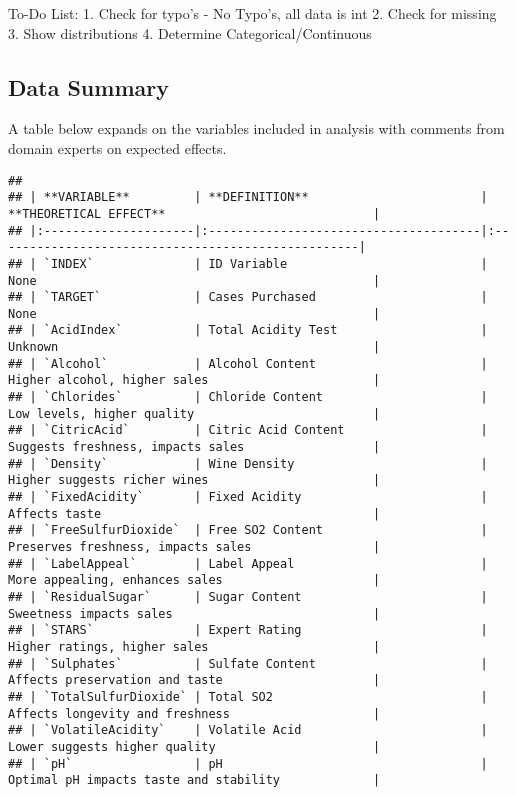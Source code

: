 \documentclass[
]{article}
\begin{document}
To-Do List: 1. Check for typo's - No Typo's, all data is int 2. Check
for missing 3. Show distributions 4. Determine Categorical/Continuous

\subsection{Data Summary}\label{data-summary}

A table below expands on the variables included in analysis with
comments from domain experts on expected effects.

\begin{verbatim}
## 
## | **VARIABLE**         | **DEFINITION**                        | **THEORETICAL EFFECT**                             |
## |:---------------------|:--------------------------------------|:---------------------------------------------------|
## | `INDEX`              | ID Variable                           | None                                               |
## | `TARGET`             | Cases Purchased                       | None                                               |
## | `AcidIndex`          | Total Acidity Test                    | Unknown                                            |
## | `Alcohol`            | Alcohol Content                       | Higher alcohol, higher sales                       |
## | `Chlorides`          | Chloride Content                      | Low levels, higher quality                         |
## | `CitricAcid`         | Citric Acid Content                   | Suggests freshness, impacts sales                  |
## | `Density`            | Wine Density                          | Higher suggests richer wines                       |
## | `FixedAcidity`       | Fixed Acidity                         | Affects taste                                      |
## | `FreeSulfurDioxide`  | Free SO2 Content                      | Preserves freshness, impacts sales                 |
## | `LabelAppeal`        | Label Appeal                          | More appealing, enhances sales                     |
## | `ResidualSugar`      | Sugar Content                         | Sweetness impacts sales                            |
## | `STARS`              | Expert Rating                         | Higher ratings, higher sales                       |
## | `Sulphates`          | Sulfate Content                       | Affects preservation and taste                     |
## | `TotalSulfurDioxide` | Total SO2                             | Affects longevity and freshness                    |
## | `VolatileAcidity`    | Volatile Acid                         | Lower suggests higher quality                      |
## | `pH`                 | pH                                    | Optimal pH impacts taste and stability             |
\end{verbatim}
\end{document}
